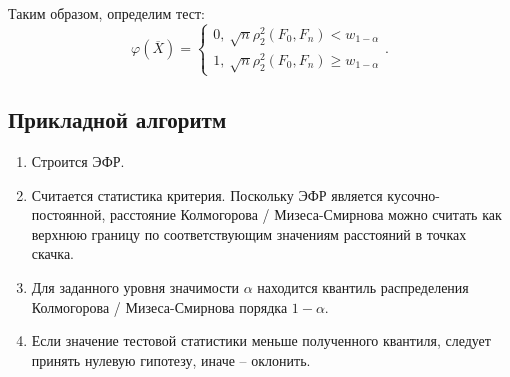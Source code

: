 Таким образом, определим тест:
\[
  \varphi(\overline{X}) = \begin{cases}
    0,~ \sqrt{n} \rho_{2}^{2}(F_0, F_n) < w_{1 - \alpha}\\
    1,~ \sqrt{n} \rho_{2}^{2}(F_0, F_n) \geqslant w_{1 - \alpha}
  \end{cases}
.\]

\pagebreak

\subsection{Прикладной алгоритм}
\begin{enumerate}
  \item Строится ЭФР.
  \item Считается статистика критерия. Поскольку ЭФР является
  кусочно-постоянной, расстояние Колмогорова / Мизеса-Смирнова можно считать как
  верхнюю границу по соответствующим значениям расстояний в точках скачка.
  \item Для заданного уровня значимости $\alpha$ находится квантиль
  распределения Колмогорова / Мизеса-Смирнова порядка $1 - \alpha$.
  \item Если значение тестовой статистики меньше полученного квантиля,
  следует принять нулевую гипотезу, иначе -- оклонить.
\end{enumerate}

